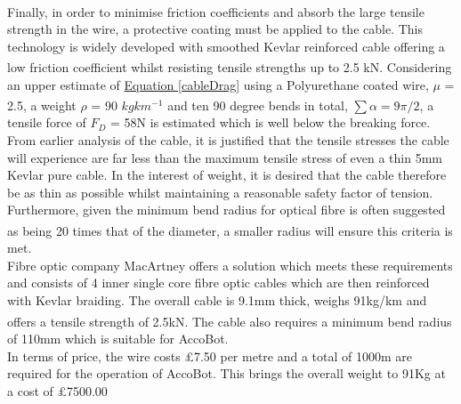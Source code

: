 \documentclass[11pt]{article}		%
\newcommand{\supercite}[1]{\textsuperscript{\cite{#1}}}		%
\newcommand{\equationref}[1]{\hyperref[#1]{Equation \ref*{#1}}}     %
\begin{document}
		    \\
            \hspace*{2ex}Finally, in order to minimise friction coefficients and absorb the large tensile strength in the wire, a protective coating must be applied to the cable. 
		    This technology is widely developed with smoothed Kevlar reinforced cable offering a low friction coefficient whilst resisting tensile strengths up to 2.5 kN\supercite{macartney}. 
		    Considering an upper estimate of \equationref{cableDrag} using a Polyurethane coated wire, $\mu$ = 2.5, a weight $\rho$ = 90 $kgkm^{-1}$\supercite{macartney} and ten 90 degree bends in total, $\sum \alpha = 9\pi/2$, a tensile force of $F_D$ = 58N is estimated which is well below the breaking force.
		    \\
            \hspace*{2ex}From earlier analysis of the cable, it is justified that the tensile stresses the cable will experience are far less than the maximum tensile stress of even a thin 5mm Kevlar pure cable. In the interest of weight, it is desired that the cable therefore be as thin as possible whilst maintaining a reasonable safety factor of tension. Furthermore, given the minimum bend radius for optical fibre is often suggested as being 20 times that of the diameter\supercite{fibrebend}, a smaller radius will ensure this criteria is met.\\
  	    	\hspace*{2ex}Fibre optic company MacArtney offers a solution which meets these requirements and consists of 4 inner single core fibre optic cables which are then reinforced with Kevlar braiding. The overall cable is 9.1mm thick, weighs 91kg/km and offers a tensile strength of 2.5kN\supercite{macartney}. The cable also requires a minimum bend radius of 110mm which is suitable for AccoBot. \\
  	    	\hspace*{2ex}In terms of price, the wire costs £7.50 per metre and a total of 1000m are required for the operation of AccoBot. This brings the overall weight to 91Kg at a cost of £7500.00 
		    	    	
\end{document}
